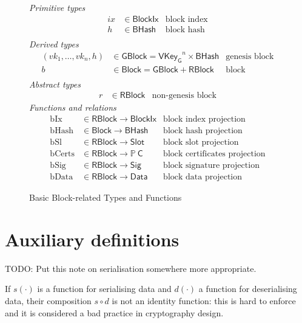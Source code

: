 \documentclass[11pt,a4paper]{article}
\newcommand{\powerset}[1]{\mathbb{P}~#1}
\newcommand{\type}[1]{\mathsf{#1}}
\newcommand{\BHash}{\type{BHash}}  %
\newcommand{\Slot}{\type{Slot}}
\newcommand{\BlockIx}{\type{BlockIx}}
\newcommand{\GBlock}{\type{GBlock}}
\newcommand{\RBlock}{\type{RBlock}}
\newcommand{\Block}{\type{Block}}
\newcommand{\HCert}{\type{C}}
\newcommand{\VKeyGen}{\type{VKey_G}}
\newcommand{\Sig}{\type{Sig}}
\newcommand{\Data}{\type{Data}}
\newcommand{\hashname}{bHash}
\newcommand{\bcertsname}{bCerts}
\newcommand{\bdataname}{bData}
\newcommand{\bsigname}{bSig}
\newcommand{\totalf}{\to}
\begin{document}
\begin{figure}
  \emph{Primitive types}
  \begin{align*}
    ix & \in \BlockIx & \text{block index}\\
     h & \in \BHash   & \text{block hash}\\
  \end{align*}
  \emph{Derived types}
  \begin{align*}
    (vk_1, \dotsc, vk_n, h) & \in \GBlock = \VKeyGen^n \times \BHash & \text{genesis block} \\
    b & \in \Block = \GBlock + \RBlock & \text{block} \\
  \end{align*}
  \emph{Abstract types}
  \begin{align*}
    r & \in \RBlock & \text{non-genesis block}
  \end{align*}
  \emph{Functions and relations}
  \begin{align*}
    \text{bIx} & \in \RBlock \totalf \BlockIx & \text{block index projection} \\
    \text{\hashname} & \in \Block \totalf \BHash
      & \text{block hash projection} \\
    \text{bSl} & \in \RBlock \totalf \Slot & \text{block slot projection} \\
    \text{\bcertsname} & \in \RBlock \totalf \powerset{\HCert}
      & \text{block certificates projection} \\
    \text{\bsigname} & \in \RBlock \totalf \Sig & \text{block signature projection} \\
    \text{\bdataname} & \in \RBlock \totalf \Data & \text{block data projection}
  \end{align*}
  \caption{Basic Block-related Types and Functions}
  \label{fig:block-defs}
\end{figure}


\section{Auxiliary definitions}
\label{sec:auxil-defin}
TODO: Put this note on serialisation somewhere more appropriate.

If $s(\cdot)$ is a function for serialising data and $d(\cdot)$ a function for
deserialising data, their composition $s \circ d$ is not an identity function:
%
this is hard to enforce and it is considered a bad practice in cryptography
design.

\end{document}
